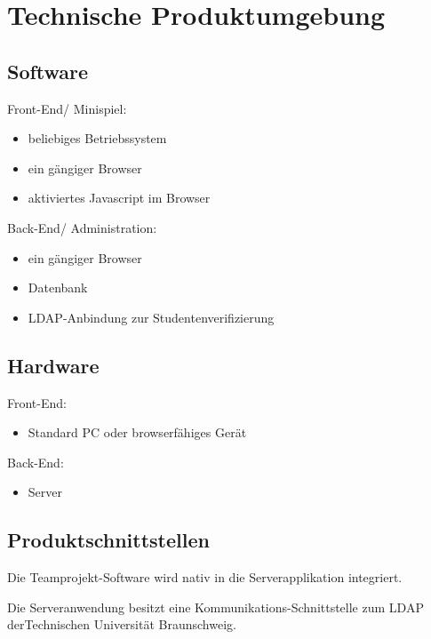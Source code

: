 

\chapter{Technische Produktumgebung}

\section{Software}

Front-End/ Minispiel:
\begin{itemize}
	\item beliebiges Betriebssystem
	\item ein g\"angiger Browser
	\item aktiviertes Javascript im Browser
\end{itemize}

Back-End/ Administration:
\begin{itemize}
	\item ein gängiger Browser
	\item Datenbank
	\item LDAP-Anbindung zur Studentenverifizierung
\end{itemize}


\section{Hardware}

Front-End:
\begin{itemize}
	\item Standard PC oder browserfähiges Gerät
\end{itemize}

Back-End:
\begin{itemize}
	\item Server
\end{itemize}


\section{Produktschnittstellen}

Die Teamprojekt-Software wird nativ in die Serverapplikation integriert.

Die Serveranwendung besitzt eine Kommunikations-Schnittstelle zum LDAP derTechnischen Universit\"at Braunschweig.
